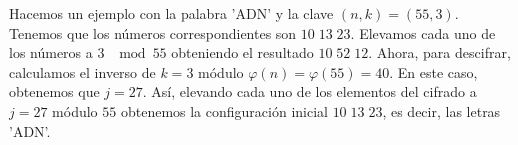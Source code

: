 \begin{eg}
\normalfont Hacemos un ejemplo con la palabra 'ADN' y la clave $\displaystyle \left(n,k\right) = \left(55,3\right) $. Tenemos que los números correspondientes son $\displaystyle 10 \; 13 \; 23 $. Elevamos cada uno de los números a 3 $\displaystyle \mod 55 $ obteniendo el resultado $\displaystyle 10 \; 52 \; 12 $. Ahora, para descifrar, calculamos el inverso de $\displaystyle k = 3 $ módulo $\displaystyle \varphi\left(n\right) = \varphi\left(55\right) = 40 $. En este caso, obtenemos que $\displaystyle j=27 $. Así, elevando cada uno de los elementos del cifrado a $\displaystyle j = 27 $ módulo $\displaystyle 55 $ obtenemos la configuración inicial $\displaystyle 10 \; 13 \; 23 $, es decir, las letras 'ADN'.
\end{eg}

